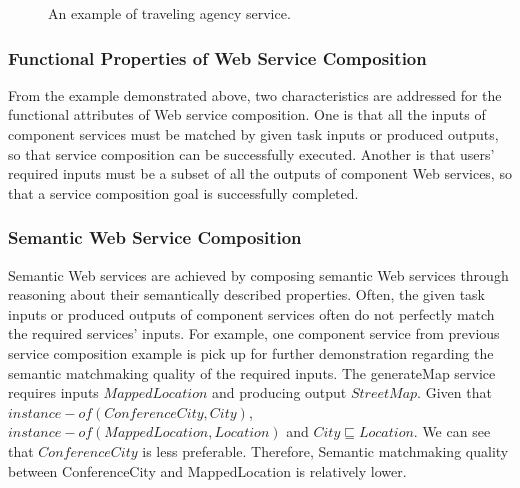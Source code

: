 \begin{figure}
\centerline{
}
\caption{An example of traveling agency service.}
\label{fig:wsc_example}
\end{figure}

\subsubsection{Functional Properties of Web Service Composition}
From the example demonstrated above, two characteristics are addressed for the functional attributes of Web service composition. One is that all the inputs of component services must be matched by given task inputs or produced outputs, so that service composition can be successfully executed. Another is that users' required inputs must be a subset of all the outputs of component Web services, so that a service composition goal is successfully completed. 


\subsubsection{Semantic Web Service Composition}

Semantic Web services are achieved by composing semantic Web services through reasoning about their semantically described properties. Often, the given task inputs or produced outputs of component services often do not perfectly match the required services' inputs. For example, one component service from previous service composition example is pick up for further demonstration regarding the semantic matchmaking quality of the required inputs. The generateMap service requires inputs $MappedLocation$ and producing output $StreetMap$. Given that $instance-of (ConferenceCity,City)$, $instance-of (MappedLocation, Location)$ and $City \sqsubseteq Location$. We can see that $ConferenceCity$ is less preferable. Therefore, Semantic matchmaking quality between ConferenceCity and  MappedLocation is relatively lower. 

